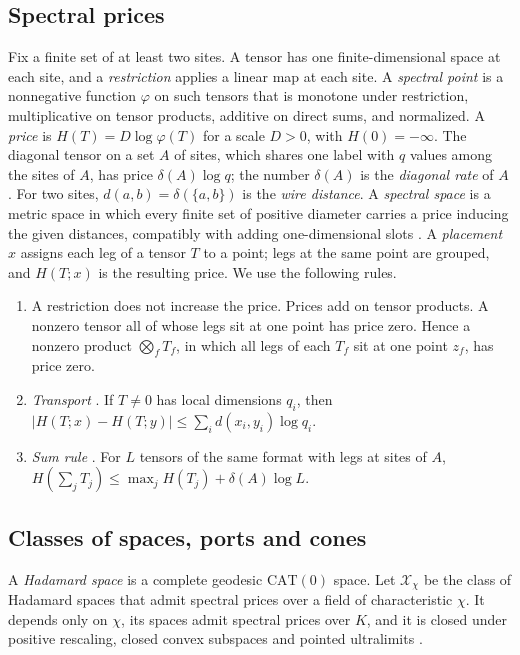 \documentclass[11pt]{article}
\theoremstyle{remark}
\begin{document}
\subsection{Spectral prices}
Fix a finite set of at least two sites. A tensor has one
finite-dimensional space at each site, and a \emph{restriction} applies a
linear map at each site. A \emph{spectral point} is a nonnegative
function \(\varphi\) on such tensors that is monotone under restriction,
multiplicative on tensor products, additive on direct sums, and
normalized. A \emph{price} is \(H(T)=D\log\varphi(T)\) for a scale
\(D>0\), with \(H(0)=-\infty\). The diagonal tensor on a set \(A\) of
sites, which shares one label with \(q\) values among the sites of \(A\),
has price \(\delta(A)\log q\); the number \(\delta(A)\) is the
\emph{diagonal rate} of \(A\). For two sites, \(d(a,b)=\delta(\{a,b\})\) is the \emph{wire
distance}. A \emph{spectral space} is a metric space in which every
finite set of positive diameter carries a price inducing the given
distances, compatibly with adding one-dimensional slots
\cite[Section 2.1]{hc}. A \emph{placement} \(x\) assigns each leg of a
tensor \(T\) to a point; legs at the same point are grouped, and
\(H(T;x)\) is the resulting price. We use the following rules.
\begin{enumerate}
\item[(P1)] A restriction does not increase the price. Prices add on
tensor products. A nonzero tensor all of whose legs sit at one point has
price zero. Hence a nonzero product \(\bigotimes_fT_f\), in which all
legs of each \(T_f\) sit at one point \(z_f\), has price zero.
\item[(P2)] \emph{Transport} \cite[Lemma 2.1]{hc}. If \(T\ne0\) has local
dimensions \(q_i\), then
\(|H(T;x)-H(T;y)|\le\sum_id(x_i,y_i)\log q_i\).
\item[(P3)] \emph{Sum rule} \cite[Lemma 2.1]{hc}. For \(L\) tensors of
the same format with legs at sites of \(A\),
\(H(\sum_{j}T_j)\le\max_jH(T_j)+\delta(A)\log L\).
\end{enumerate}

\subsection{Classes of spaces, ports and cones}\label{sec:classes}
A \emph{Hadamard space} is a complete geodesic \(\mathrm{CAT}(0)\) space.
Let \(\mathcal X_\chi\) be the class of Hadamard spaces that admit
spectral prices over a field of characteristic \(\chi\). It depends only
on \(\chi\), its spaces admit spectral prices over \(K\), and it is
closed under positive rescaling, closed convex subspaces and pointed
ultralimits \cite[Section 2.2]{hc}.
\end{document}
